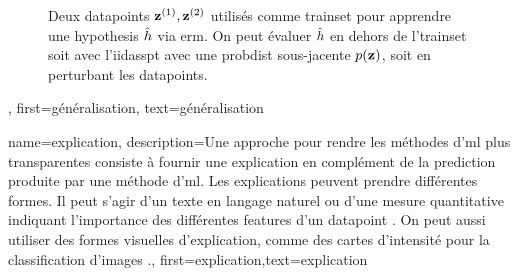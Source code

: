 {{\begin{figure}[H]
			\caption{Deux \glspl{datapoint} ${\bf z}^{(1)},{\bf z}^{(2)}$ utilisés comme \gls{trainset} pour apprendre une \gls{hypothesis} $\hat{h}$ via \gls{erm}. On peut évaluer $\hat{h}$ en dehors de l'\gls{trainset} soit avec l'\gls{iidasspt} avec une \gls{probdist} sous-jacente $p({\bf z})$, soit en perturbant les \glspl{datapoint}.}
			\label{fig:polynomial_fit_dict}
		\end{figure}
	},
	first={généralisation},
	text={généralisation}
}

{name={explication},
	description={Une approche pour rendre les méthodes d'\gls{ml} plus transparentes consiste à fournir une explication en complément de la \gls{prediction} produite par une méthode d'\gls{ml}. Les explications peuvent prendre différentes formes. Il peut s’agir d’un texte en langage naturel ou d’une mesure quantitative indiquant l’importance des différentes \glspl{feature} d’un \gls{datapoint} \cite{Molnar2019}. On peut aussi utiliser des formes visuelles d’explication, comme des cartes d’intensité pour la \gls{classification} d’images \cite{GradCamPaper}.},
	first={explication},text={explication}
}

